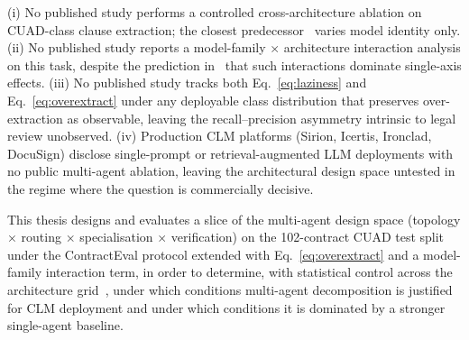 (i) No published study
performs a controlled cross-architecture ablation on CUAD-class clause extraction; the
closest predecessor~\cite{liu2025contracteval} varies model identity only.
(ii) No published study reports a model-family $\times$ architecture interaction
analysis on this task, despite the prediction in~\cite{bogavelli2025agentarch} that
such interactions dominate single-axis effects. (iii) No published study tracks both
Eq.~\eqref{eq:laziness} and Eq.~\eqref{eq:overextract} under any deployable
class distribution that preserves over-extraction as observable, leaving the
recall--precision asymmetry intrinsic to legal review unobserved. (iv) Production CLM platforms (Sirion, Icertis, Ironclad, DocuSign)
disclose single-prompt or retrieval-augmented LLM deployments with no public
multi-agent ablation, leaving the architectural design space untested in the regime
where the question is commercially decisive.

This thesis designs and evaluates a slice of the multi-agent design space (topology
$\times$ routing $\times$ specialisation $\times$ verification) on the 102-contract
CUAD test split under the ContractEval protocol extended with
Eq.~\eqref{eq:overextract}
and a model-family interaction term, in order to determine, with statistical control
across the architecture grid~\cite{benjamini1995controlling,dror2018hitchhikers},
under which conditions multi-agent decomposition is justified for CLM deployment and
under which conditions it is dominated by a stronger single-agent baseline.
